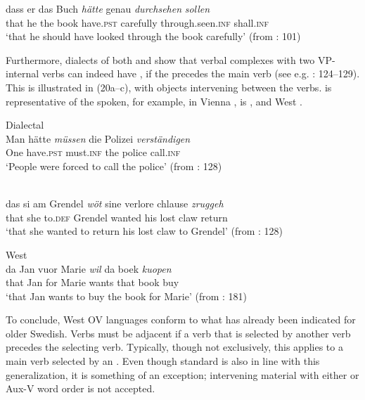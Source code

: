 \documentclass[output=paper, colorlinks, citecolor=brown]{langscibook}
\begin{document}
\ex\label{ex:sangfelt:19b}
\gll dass er das Buch \textit{hätte} {genau} \textit{durchsehen} \textit{sollen}\\
 that he the book have.\textsc{pst} carefully through.seen.\textsc{inf} shall.\textsc{inf} \\
\glt ‘that he should have looked through the book carefully’ (from \citealt{Sheehan2017Final}: 101)
\z 
\z

Furthermore, dialects of both  and  show that verbal complexes with two VP-internal verbs can indeed have , if the  precedes the main verb (see e.g. \citealt{Sapp2011}: 124–129). This is illustrated in (20a–c), with objects intervening between the verbs.  is representative of the  spoken, for example, in Vienna \citep[128]{Haider2013},  is , and  West \ili{}.


\ea 
\label{ex:sangfelt:20}
\ea Dialectal \label{ex:sangfelt:20a}\\
\gll Man hätte \textit{müssen} {die} {Polizei} \textit{verständigen} \\
 One have.\textsc{pst} must.\textsc{inf} the police call.\textsc{inf} \\
\glt ‘People were forced to call the police’ (from \citealt{Haider2013}: 128)

\ex {}\label{ex:sangfelt:20b}\\
\gll das si am Grendel \textit{wöt} {sine} {verlore} {chlause} \textit{zruggeh}\\
 that she to.\textsc{def} Grendel wanted his lost claw return \\
\glt ‘that she wanted to return his lost claw to Grendel’ (from \citealt{Haider2013}: 128)

\ex West \label{ex:sangfelt:20c}\\
\gll da Jan vuor Marie \textit{wil} {da} {boek} \textit{kuopen} \\
 that Jan for Marie wants that book buy \\
\glt ‘that Jan wants to buy the book for Marie’ (from \citealt{Haegeman1992}: 181)\\
\z
\z

To conclude, West  OV languages conform to what has already been indicated for older Swedish. Verbs must be adjacent if a verb that is selected by another verb precedes the selecting verb. Typically, though not exclusively, this applies to a main verb selected by an . Even though standard  is also in line with this generalization, it is something of an exception; intervening material with either  or Aux-V word order is not accepted.
\end{document}
